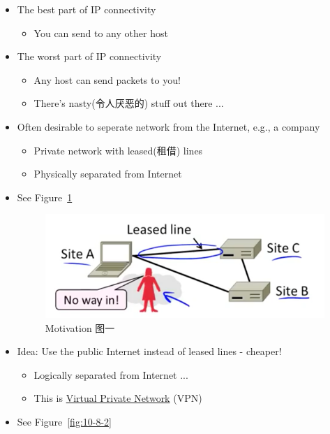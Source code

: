 \documentclass[12pt]{ctexart}   %
\begin{document}
	\begin{itemize}
		\item The best part of IP connectivity
		\begin{itemize}
			\item You can send to any other host
		\end{itemize}

		\item The worst part of IP connectivity
		\begin{itemize}
			\item Any host can send packets to you!
			\item There's nasty(令人厌恶的) stuff out there ...
		\end{itemize}

		\item Often desirable to seperate network from the Internet, e.g., a company 
		\begin{itemize}
			\item Private network with leased(租借) lines
			\item Physically separated from Internet
		\end{itemize}
		\item See Figure~\ref{fig:10-8-1}
		  
		\begin{figure}[h!] %
		\centering
		\includegraphics[scale=0.7]{images/10-8-1}
		\caption{Motivation 图一}
		\label{fig:10-8-1}
		\end{figure}

		\item Idea: Use the public Internet instead of leased lines - cheaper!
		\begin{itemize}
			\item Logically separated from Internet ... 
			\item This is \underline{Virtual Private Network} (VPN)
		\end{itemize}
		\item See Figure~\ref{fig:10-8-2}
		  

\end{itemize}
\end{document}
